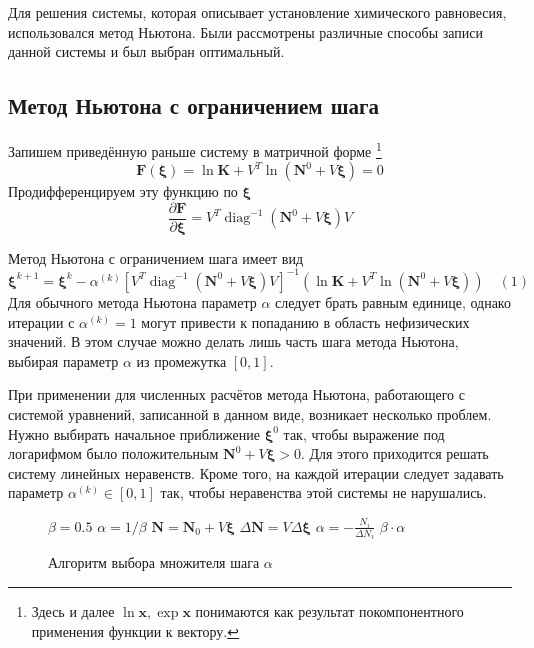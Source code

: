 \documentclass[14pt,a4paper]{extarticle}
\newcounter{algorithmic}
\newenvironment{myalgorithmic}[1][0]{\stepcounter{algorithmic}\begin{algorithmic}[#1]}{\end{algorithmic}}
\newcommand{\diag}{\operatorname{diag}}
\renewcommand{\vec}[1]{\boldsymbol{\mathbf{#1}}}
\begin{document}
Для решения системы, которая описывает установление химического равновесия, использовался метод Ньютона. Были рассмотрены различные способы записи данной системы и был выбран оптимальный.

\subsection{Метод Ньютона с ограничением шага}

Запишем приведённую раньше систему в матричной форме
\footnote{Здесь и далее $\ln \vec x, \exp \vec x$ понимаются как результат покомпонентного применения функции к вектору.}
$$\vec{F}(\vec \xi) = \ln{\vec{K}} + V^T \ln{(\vec{N}^0 + V\vec \xi)} = 0$$
Продифференцируем эту функцию по $\vec \xi$
$$\frac{\partial \vec{F}}{\partial{\vec{\xi}}} = V^T\diag^{-1}(\vec{N}^0 + V\vec{\xi})V$$

Метод Ньютона с ограничением шага \cite{kalit} имеет вид
$$\vec{\xi}^{k+1} = \vec{\xi}^{k} - \alpha^{(k)}[V^T\diag^{-1}(\vec{N}^0 + V\vec{\xi})V]^{-1}(\ln{\vec{K}} + V^T \ln{(\vec{N}^0 + V\vec{\xi})}) \quad (1)$$
Для обычного метода Ньютона параметр $\alpha$ следует брать равным единице, однако итерации с $\alpha^{(k)} = 1$ могут привести к попаданию в область нефизических значений. В этом случае можно делать лишь часть шага метода Ньютона, выбирая параметр $\alpha$ из промежутка $[0, 1]$.   

При применении для численных расчётов метода Ньютона, работающего с системой уравнений, записанной в данном виде, возникает несколько проблем. Нужно выбирать начальное приближение $\vec{\xi}^0$ так, чтобы выражение под логарифмом было положительным $\vec{N}^0 + V\vec{\xi} > 0$. Для этого приходится решать систему линейных неравенств. Кроме того, на каждой итерации следует задавать параметр $\alpha^{(k)} \in [0,1]$ так, чтобы неравенства этой системы не нарушались.  
\begin{figure}[!h]
\begin{myalgorithmic}[1]
\Function{ChooseAlpha}{$\vec N_0, V, \vec \xi,\Delta \vec \xi$}
\State $\beta = 0.5$ 
\State $\alpha = 1 / \beta$
\State $\vec N = \vec N_0 + V \vec \xi$ 
\State $\Delta \vec N = V \Delta \vec \xi$ 
\State $\alpha = -\frac{N_i}{\Delta N_i}$ 
\EndIf
\EndFor
\State \Return $\beta \cdot \alpha$
\EndFunction
\end{myalgorithmic}
\caption{Алгоритм выбора множителя шага $\alpha$}
\end{figure}
\end{document}
